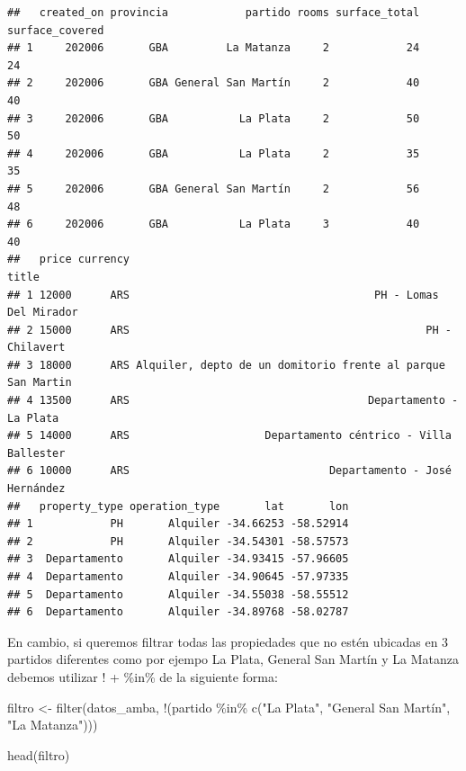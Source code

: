 \documentclass[
  spanish,
]{book}
\newenvironment{Shaded}{\begin{snugshade}}{\end{snugshade}}
\newcommand{\FunctionTok}[1]{\textcolor[rgb]{0.00,0.00,0.00}{#1}}
\newcommand{\NormalTok}[1]{#1}
\newcommand{\OtherTok}[1]{\textcolor[rgb]{0.56,0.35,0.01}{#1}}
\newcommand{\SpecialCharTok}[1]{\textcolor[rgb]{0.00,0.00,0.00}{#1}}
\newcommand{\StringTok}[1]{\textcolor[rgb]{0.31,0.60,0.02}{#1}}
\begin{document}
\begin{verbatim}
##   created_on provincia            partido rooms surface_total surface_covered
## 1     202006       GBA         La Matanza     2            24              24
## 2     202006       GBA General San Martín     2            40              40
## 3     202006       GBA           La Plata     2            50              50
## 4     202006       GBA           La Plata     2            35              35
## 5     202006       GBA General San Martín     2            56              48
## 6     202006       GBA           La Plata     3            40              40
##   price currency                                                       title
## 1 12000      ARS                                      PH - Lomas Del Mirador
## 2 15000      ARS                                              PH - Chilavert
## 3 18000      ARS Alquiler, depto de un domitorio frente al parque San Martin
## 4 13500      ARS                                     Departamento - La Plata
## 5 14000      ARS                     Departamento céntrico - Villa Ballester
## 6 10000      ARS                               Departamento - José Hernández
##   property_type operation_type       lat       lon
## 1            PH       Alquiler -34.66253 -58.52914
## 2            PH       Alquiler -34.54301 -58.57573
## 3  Departamento       Alquiler -34.93415 -57.96605
## 4  Departamento       Alquiler -34.90645 -57.97335
## 5  Departamento       Alquiler -34.55038 -58.55512
## 6  Departamento       Alquiler -34.89768 -58.02787
\end{verbatim}

En cambio, si queremos filtrar todas las propiedades que no estén ubicadas en 3 partidos diferentes como por ejempo La Plata, General San Martín y La Matanza debemos utilizar ! + \%in\% de la siguiente forma:

\begin{Shaded}
\begin{Highlighting}[]
\NormalTok{filtro }\OtherTok{\textless{}{-}} \FunctionTok{filter}\NormalTok{(datos\_amba, }\SpecialCharTok{!}\NormalTok{(partido }\SpecialCharTok{\%in\%} \FunctionTok{c}\NormalTok{(}\StringTok{"La Plata"}\NormalTok{, }\StringTok{"General San Martín"}\NormalTok{, }\StringTok{"La Matanza"}\NormalTok{)))}

\FunctionTok{head}\NormalTok{(filtro)}
\end{Highlighting}
\end{Shaded}
\end{document}
